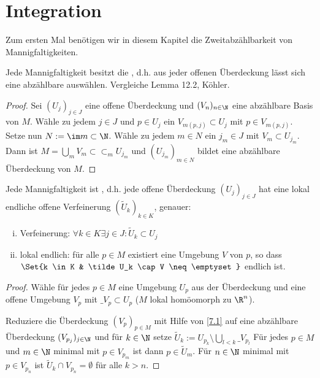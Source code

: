 \chapter{Integration}



Zum ersten Mal benötigen wir in diesem Kapitel die Zweitabzählbarkeit von Mannigfaltigkeiten.

\begin{lem} \label{7.1}
    Jede Mannigfaltigkeit besitzt die , d.h. aus jeder offenen Überdeckung lässt sich eine abzählbare auswählen.
    Vergleiche Lemma 12.2, Köhler.
    \begin{proof}
        Sei $(U_j)_{j \in J}$ eine offene Überdeckung und $(V_n)_{n \in \N}$ eine abzählbare Basis von $M$.
        Wähle zu jedem $j \in J$ und $p \in U_j$ ein $V_{m(p,j)} \subset U_j$ mit $p \in V_{m(p,j)}$.
        Setze nun $N := \im m \subset \N$.
        Wähle zu jedem $m \in N$ ein $j_m \in J$ mit $V_m \subset U_{j_m}$.
        Dann ist $M = \bigcup_m V_m \subset \subset_m U_{j_m}$ und $(U_{j_m})_{m \in N}$ bildet eine abzählbare Überdeckung von $M$.
    \end{proof}
\end{lem}

\begin{lem} \label{7.2}
    Jede Mannigfaltigkeit ist , d.h. jede offene Überdeckung $(U_j)_{j \in J}$ hat eine lokal endliche offene Verfeinerung $(\tilde U_k)_{k \in K}$, genauer:
    \begin{enumerate}[(i)]
        \item
            Verfeinerung: $\forall k \in K \exists j \in J : \tilde U_k \subset U_j$
        \item
            lokal endlich: für alle $p \in M$ existiert eine Umgebung $V$ von $p$, so dass
            \begin{math}
                \Set{k \in K & \tilde U_k \cap V \neq \emptyset}
            \end{math}
            endlich ist.
    \end{enumerate}
    \begin{proof}
        Wähle für jedes $p \in M$ eine Umgebung $U_p$ aus der Überdeckung und eine offene Umgebung $V_p$ mit $\_{V_p} \subset U_p$ ($M$ lokal homöomorph zu $\R^n$).

        Reduziere die Überdeckung $(V_p)_{p \in M}$ mit Hilfe von \ref{7.1} auf eine abzählbare Überdeckung $(V_{p_j})_{j \in \N}$ und für $k \in \N$ setze
        \begin{math}
            \tilde U_k := U_{p_k} \setminus \bigcup_{l < k} \_{V_{p_l}}
        \end{math}
        Für jedes $p \in M$ und $m \in \N$ minimal mit $p \in V_{p_m}$ ist dann $p \in \tilde U_m$.
        Für $n \in \N$ minimal mit $p \in V_{p_n}$ ist $\tilde U_k \cap V_{p_n} = \emptyset$ für alle $k > n$.
    \end{proof}
\end{lem}

